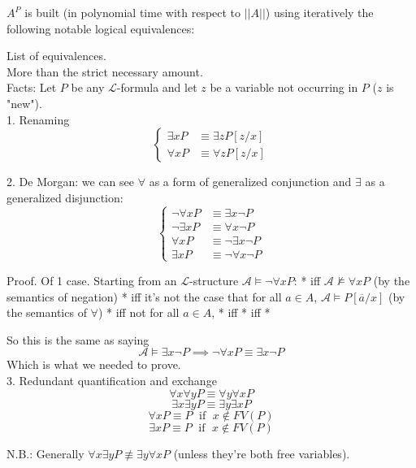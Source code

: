 $A^P$ is built (in polynomial time with respect to $||A||$) using iteratively the following notable logical equivalences: 


List of equivalences. \\

More than the strict necessary amount.\\

Facts: Let $P$ be any $\mathcal{L}$-formula and let $z$ be a variable not occurring in $P$ ($z$ is "new").\\

1. Renaming
$$ 
\begin{cases}
	\exists x P & \equiv \exists z P[z/x] \\
	\forall x P & \equiv \forall z P [z/x]
\end{cases}
$$

2. De Morgan: we can see $\forall$ as a form of generalized conjunction and $\exists$ as a generalized disjunction:
$$
\begin{cases}
	\neg \forall x P & \equiv \exists x \neg P \\
	\neg \exists x P & \equiv \forall x \neg P \\
	\forall x P & \equiv \neg\exists x \neg P \\
	\exists x P & \equiv \neg \forall x \neg P 
\end{cases}
$$

Proof. Of 1 case. Starting from an $\mathcal{L}$-structure $\mathcal{A} \models \neg \forall x P$:
* iff $\mathcal{A} \not \models \forall x P$ (by the semantics of negation)
* iff it's not the case that for all $a \in A$, $\mathcal{A} \models P [\overline a/ x]$ (by the semantics of $\forall$)
* iff not for all $a \in A$, 
* iff
* iff
* %

So this is the same as saying
$$ \mathcal{A} \models \exists x \neg P \implies \neg \forall x P \equiv \exists x \neg P $$
Which is what we needed to prove.\\

3. Redundant quantification and exchange
$$ \forall x \forall y P \equiv \forall y \forall x P $$
$$ \exists x \exists y P \equiv \exists y \exists x P $$
$$ \forall x P \equiv P \; \text{ if } \; x \notin FV(P) $$
$$ \exists x P \equiv P \; \text{ if } \; x \notin FV(P) $$

N.B.: Generally $\forall x \exists y P \not \equiv \exists y \forall x P$ (unless they're both free variables).\\

